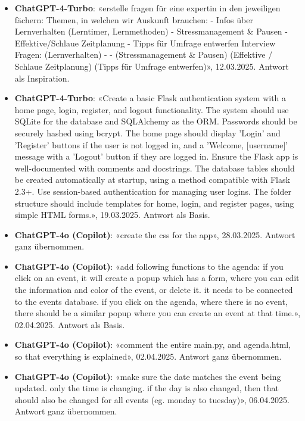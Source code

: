 \documentclass[12pt, a4paper]{article}
\begin{document}
\begin{itemize}

    \item \textbf{ChatGPT-4-Turbo}: «erstelle fragen für eine expertin in den jeweiligen fächern: Themen, in welchen wir Auskunft brauchen: - Infos über Lernverhalten (Lerntimer, Lernmethoden) - Stressmanagement \& Pausen - Effektive/Schlaue Zeitplanung - Tipps für Umfrage entwerfen Interview Fragen: (Lernverhalten) - - (Stressmanagement \& Pausen) (Effektive / Schlaue Zeitplanung) (Tipps für Umfrage entwerfen)», 12.03.2025. Antwort als Inspiration.
    
    \item \textbf{ChatGPT-4-Turbo}: «Create a basic Flask authentication system with a home page, login, register, and logout functionality. The system should use SQLite for the database and SQLAlchemy as the ORM. Passwords should be securely hashed using bcrypt. The home page should display 'Login' and 'Register' buttons if the user is not logged in, and a 'Welcome, [username]' message with a 'Logout' button if they are logged in. Ensure the Flask app is well-documented with comments and docstrings. The database tables should be created automatically at startup, using a method compatible with Flask 2.3+. Use session-based authentication for managing user logins. The folder structure should include templates for home, login, and register pages, using simple HTML forms.», 19.03.2025. Antwort als Basis.
    
    \item \textbf{ChatGPT-4o (Copilot)}: «create the css for the app», 28.03.2025. Antwort ganz übernommen.
    
    \item \textbf{ChatGPT-4o (Copilot)}: «add following functions to the agenda: if you click on an event, it will create a popup which has a form, where you can edit the information and color of the event, or delete it. it needs to be connected to the events database. if you click on the agenda, where there is no event, there should be a similar popup where you can create an event at that time.», 02.04.2025. Antwort als Basis.
    
    \item \textbf{ChatGPT-4o (Copilot)}: «comment the entire main.py, and agenda.html, so that everything is explained», 02.04.2025. Antwort ganz übernommen.
    
    \item \textbf{ChatGPT-4o (Copilot)}: «make sure the date matches the event being updated. only the time is changing. if the day is also changed, then that should also be changed for all events (eg. monday to tuesday)», 06.04.2025. Antwort ganz übernommen.
    

\end{itemize}
\end{document}
